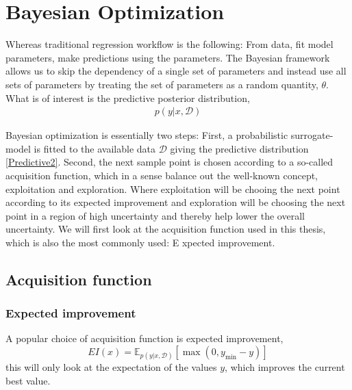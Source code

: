 \chapter{Bayesian Optimization}
Whereas traditional regression workflow is the following: From data, fit model parameters, make predictions using the parameters. 
The Bayesian framework allows us to skip the dependency of a single set of parameters and instead use all sets of parameters 
by treating the set of parameters as a random quantity, $\theta$. What is of interest is the predictive posterior distribution,  
\begin{align}\label{Predictive2}
    p(y|x, \mathcal{D})
\end{align}

Bayesian optimization is essentially two steps: First, a probabilistic surrogate-model is fitted
to the available data $\mathcal{D}$ giving the predictive distribution \eqref{Predictive2}. Second,
the next sample point is chosen according to a so-called acquisition function, which in a sense
balance out the well-known concept, exploitation and exploration. Where exploitation will be chooing
the next point according to its expected improvement and exploration will be choosing the next point
in a region of high uncertainty and thereby help lower the overall uncertainty. We will first look at
the acquisition function used in this thesis, which is also the most commonly used: E   xpected improvement. 

\section{Acquisition function}

\subsection{Expected improvement}
A popular choice of acquisition function is expected improvement, 
$$EI(x) = \mathbb{E}_{p(y|x,\mathcal{D})}[\max(0, y_{\min}-y)]$$
this will only look at the expectation of the values $y$, which improves the current best value.

